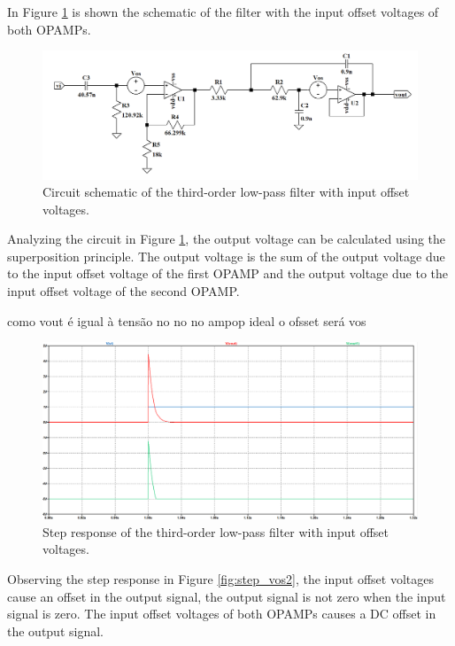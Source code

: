 In Figure \ref{fig:sch_vos} is shown the schematic of the filter with the input offset voltages of both OPAMPs.

\begin{figure}[H]
    \centering
    \includegraphics[width=1\linewidth]{images/sch_vos.png}
    \caption{Circuit schematic of the third-order low-pass filter with input offset voltages.}
    \label{fig:sch_vos}
\end{figure}

Analyzing the circuit in Figure \ref{fig:sch_vos}, the output voltage can be calculated using the superposition principle. The output voltage is the sum of the output voltage due to the input offset voltage of the first OPAMP and the output voltage due to the input offset voltage of the second OPAMP. 

como vout é igual à tensão no no no ampop ideal o ofsset será vos

\begin{figure}[H]
    \centering
    \includegraphics[width=1\linewidth]{images/step_vos.png}
    \caption{Step response of the third-order low-pass filter with input offset voltages.}
    \label{fig:step_vos}
\end{figure}

Observing the step response in Figure \ref{fig:step_vos2}, the input offset voltages cause an offset in the output signal, the output signal is not zero when the input signal is zero. The input offset voltages of both OPAMPs causes a DC offset in the output signal.

